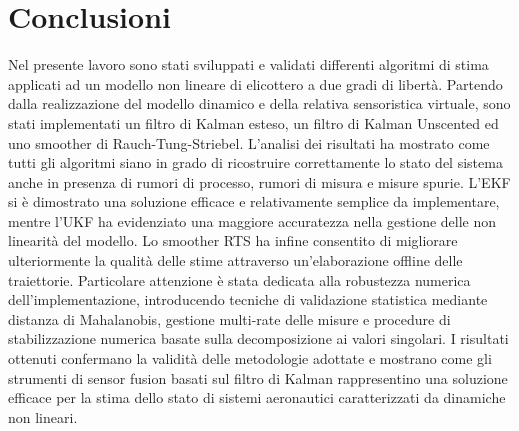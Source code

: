 \documentclass[12pt,a4paper]{article}
\begin{document}
\section{Conclusioni}
Nel presente lavoro sono stati sviluppati e validati differenti algoritmi di stima applicati ad un modello non lineare di elicottero a due gradi di libertà.
Partendo dalla realizzazione del modello dinamico e della relativa sensoristica virtuale, sono stati implementati un filtro di Kalman esteso, un filtro di Kalman Unscented ed uno smoother di Rauch-Tung-Striebel.
L'analisi dei risultati ha mostrato come tutti gli algoritmi siano in grado di ricostruire correttamente lo stato del sistema anche in presenza di rumori di processo, rumori di misura e misure spurie.
L'EKF si è dimostrato una soluzione efficace e relativamente semplice da implementare, mentre l'UKF ha evidenziato una maggiore accuratezza nella gestione delle non linearità del modello. Lo smoother RTS ha infine consentito di migliorare ulteriormente la qualità delle stime attraverso un'elaborazione offline delle traiettorie.
Particolare attenzione è stata dedicata alla robustezza numerica dell'implementazione, introducendo tecniche di validazione statistica mediante distanza di Mahalanobis, gestione multi-rate delle misure e procedure di stabilizzazione numerica basate sulla decomposizione ai valori singolari.
I risultati ottenuti confermano la validità delle metodologie adottate e mostrano come gli strumenti di sensor fusion basati sul filtro di Kalman rappresentino una soluzione efficace per la stima dello stato di sistemi aeronautici caratterizzati da dinamiche non lineari.
\end{document}

